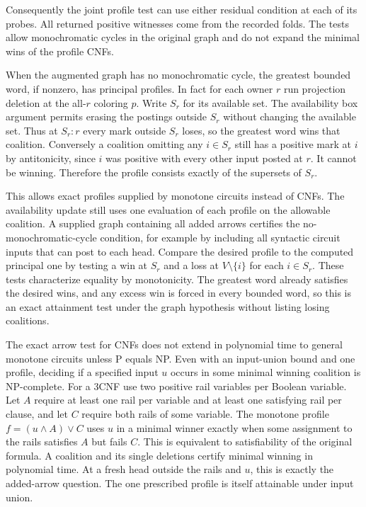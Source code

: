 Consequently the joint profile test can use either
residual condition at each of its probes. All returned
positive witnesses come from the recorded folds. The
tests allow monochromatic cycles in the original graph
and do not expand the minimal wins of the profile CNFs.

When the augmented graph has no monochromatic cycle,
the greatest bounded word, if nonzero, has principal
profiles. In fact for each owner $r$ run projection
deletion at the all-$r$ coloring $p$. Write $S_r$ for
its available set. The availability box argument
permits erasing the postings outside $S_r$ without
changing the available set. Thus at $S_r:r$ every
mark outside $S_r$ loses, so the greatest word wins
that coalition. Conversely a coalition omitting any
$i\in S_r$ still has a positive mark at $i$ by
antitonicity, since $i$ was positive with every other
input posted at $r$. It cannot be winning. Therefore
the profile consists exactly of the supersets of $S_r$.

This allows exact profiles supplied by monotone circuits
instead of CNFs. The availability update still uses
one evaluation of each profile on the allowable
coalition. A supplied graph containing all added arrows
certifies the no-monochromatic-cycle condition, for
example by including all syntactic circuit inputs that
can post to each head. Compare the desired profile to
the computed principal one by testing a win at $S_r$
and a loss at $V\setminus\{i\}$ for each $i\in S_r$.
These tests characterize equality by monotonicity.
The greatest word already satisfies the desired wins,
and any excess win is forced in every bounded word,
so this is an exact attainment test under the graph
hypothesis without listing losing coalitions.

The exact arrow test for CNFs does not extend in
polynomial time to general monotone circuits unless
P equals NP. Even with an input-union bound and one
profile, deciding if a specified input $u$ occurs in
some minimal winning coalition is NP-complete. For
a 3CNF use two positive rail variables per Boolean
variable. Let $A$ require at least one rail per
variable and at least one satisfying rail per clause,
and let $C$ require both rails of some variable.
The monotone profile $f=(u\land A)\lor C$ uses $u$
in a minimal winner exactly when some assignment to
the rails satisfies $A$ but fails $C$. This is
equivalent to satisfiability of the original formula.
A coalition and its single deletions certify minimal
winning in polynomial time. At a fresh head outside
the rails and $u$, this is exactly the added-arrow
question. The one prescribed profile is itself
attainable under input union.


